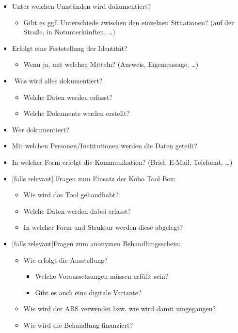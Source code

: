 \begin{itemize}
	\item Unter welchen Umständen wird dokumentiert?
	\begin{itemize}
		\item Gibt es ggf. Unterschiede zwischen den einzelnen Situationen? (auf der Straße, in Notunterkünften, …)
	\end{itemize}
	\item Erfolgt eine Feststellung der Identität?
	\begin{itemize}
		\item Wenn ja, mit welchen Mitteln? (Ausweis, Eigenaussage, …)
	\end{itemize}
	\item ­	Was wird alles dokumentiert?
	\begin{itemize}
		\item Welche Daten werden erfasst?
		\item Welche Dokumente werden erstellt?
	\end{itemize}
	\item Wer dokumentiert?
	\item Mit welchen Personen/Institutionen werden die Daten geteilt?
	\item In welcher Form erfolgt die Kommunikation? (Brief, E-Mail, Telefonat, …)
	\item {}[falls relevant] Fragen zum Einsatz der Kobo Tool Box:
	\begin{itemize}
		\item Wie wird das Tool gehandhabt?
		\item Welche Daten werden dabei erfasst?
		\item In welcher Form und Struktur werden diese abgelegt?
	\end{itemize}
	\item {}[falls relevant]Fragen zum anonymen Behandlungsschein:
	\begin{itemize}
		\item Wie erfolgt die Ausstellung?
		\begin{itemize}
			\item Welche Voraussetzungen müssen erfüllt sein?
			\item Gibt es auch eine digitale Variante?
		\end{itemize}
		\item Wie wird der ABS verwendet bzw. wie wird damit umgegangen?
		\item Wie wird die Behandlung finanziert?
	\end{itemize}
\end{itemize}

